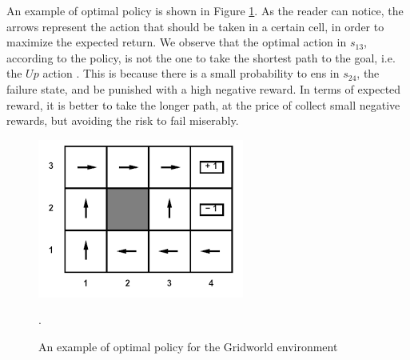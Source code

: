 \begin{example}
An example of optimal policy is shown in Figure \ref{gridworld-optimal-policy}. As the reader can notice, the arrows represent the action that should be taken in a certain cell, in order to maximize the expected return. We observe that the optimal action in $s_{13}$, according to the policy, is not the one to take the shortest path to the goal, i.e. the $Up$ action	. This is because there is a small probability to ens in $s_{24}$, the failure state, and be punished with a high negative reward. In terms of expected reward, it is better to take the longer path, at the price of collect small negative rewards, but avoiding the risk to fail miserably.
\begin{figure}
	\centering
	\includegraphics[width=.4\linewidth]{images/gridworld-optimal-policy}
	\caption{An example of optimal policy for the Gridworld environment}\label{gridworld-optimal-policy}. 
\end{figure}

\end{example}

